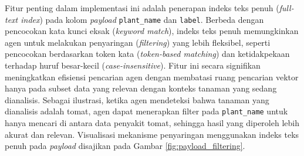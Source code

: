 \begin{table}[H]
    \centering
    \caption{Skema Poin (Vektor dan Payload) pada Indeks Qdrant}
    \label{tab:qdrant_schema}
    \small
\end{table}

Fitur penting dalam implementasi ini adalah penerapan indeks teks penuh (\textit{full-text index}) pada kolom \textit{payload} \texttt{plant\_name} dan \texttt{label}. Berbeda dengan pencocokan kata kunci eksak (\textit{keyword match}), indeks teks penuh memungkinkan agen untuk melakukan penyaringan (\textit{filtering}) yang lebih fleksibel, seperti pencocokan berdasarkan token kata (\textit{token-based matching}) dan ketidakpekaan terhadap huruf besar-kecil (\textit{case-insensitive}). Fitur ini secara signifikan meningkatkan efisiensi pencarian agen dengan membatasi ruang pencarian vektor hanya pada subset data yang relevan dengan konteks tanaman yang sedang dianalisis. Sebagai ilustrasi, ketika agen mendeteksi bahwa tanaman yang dianalisis adalah tomat, agen dapat menerapkan filter pada \texttt{plant\_name} untuk hanya mencari di antara data penyakit tomat, sehingga hasil yang diperoleh lebih akurat dan relevan. Visualisasi mekanisme penyaringan menggunakan indeks teks penuh pada \textit{payload} disajikan pada Gambar \ref{fig:payload_filtering}.

